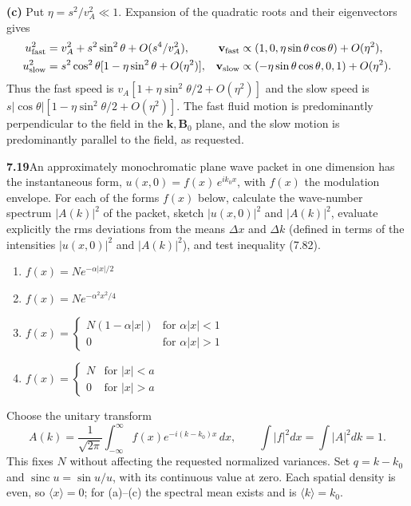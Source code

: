 \textbf{(c)} Put $\eta=s^2/v_A^2\ll1$. Expansion of the quadratic
roots and their eigenvectors gives
\begin{align*}
u_{\rm fast}^2&=v_A^2+s^2\sin^2\theta+O(s^4/v_A^2),&
\mathbf v_{\rm fast}&\propto(1,0,\eta\sin\theta\cos\theta)+O(\eta^2),\\
u_{\rm slow}^2&=s^2\cos^2\theta[1-\eta\sin^2\theta+O(\eta^2)],&
\mathbf v_{\rm slow}&\propto(-\eta\sin\theta\cos\theta,0,1)+O(\eta^2).
\end{align*}
Thus the fast speed is
$v_A[1+\eta\sin^2\theta/2+O(\eta^2)]$ and the slow speed is
$s|\cos\theta|[1-\eta\sin^2\theta/2+O(\eta^2)]$.
The fast fluid motion is predominantly perpendicular to the field
in the $\mathbf k,\mathbf B_0$ plane, and the slow motion is
predominantly parallel to the field, as requested.

\par\bigskip
\noindent\textbf{7.19}\quad An approximately monochromatic plane wave packet in one dimension has the instantaneous form, $u(x,0)=f(x)\,e^{ik_{0}x}$, with $f(x)$ the modulation envelope. For each of the forms $f(x)$ below, calculate the wave-number spectrum $|A(k)|^{2}$ of the packet, sketch $|u(x,0)|^{2}$ and $|A(k)|^{2}$, evaluate explicitly the rms deviations from the means $\Delta x$ and $\Delta k$ (defined in terms of the intensities $|u(x,0)|^{2}$ and $|A(k)|^{2}$), and test inequality (7.82).
\begin{enumerate}
\item[(a)] $f(x)=Ne^{-\alpha|x|/2}$
\item[(b)] $f(x)=Ne^{-\alpha^{2}x^{2}/4}$
\item[(c)] $f(x)=\begin{cases}N(1-\alpha|x|)&\text{for }\alpha|x|<1\\0&\text{for }\alpha|x|>1\end{cases}$
\item[(d)] $f(x)=\begin{cases}N&\text{for }|x|<a\\0&\text{for }|x|>a\end{cases}$
\end{enumerate}
\solution
Choose the unitary transform
\[
A(k)=\frac1{\sqrt{2\pi}}\int_{-\infty}^\infty
 f(x)e^{-i(k-k_0)x}\,dx,
\qquad\int |f|^2dx=\int|A|^2dk=1.
\]
This fixes $N$ without affecting the requested normalized variances.
Set $q=k-k_0$ and $\operatorname{sinc}u=\sin u/u$, with its continuous
value at zero. Each spatial density is even, so $\langle x\rangle=0$;
for (a)--(c) the spectral mean exists and is $\langle k\rangle=k_0$.
